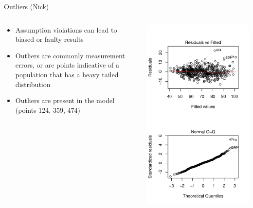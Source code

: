 \documentclass[table]{beamer}\usepackage[]{graphicx}\usepackage[]{color}
\makeatletter
\def\maxwidth{ %
  \ifdim\Gin@nat@width>\linewidth
    \linewidth
  \else
    \Gin@nat@width
  \fi
}
\newenvironment{knitrout}{}{} %
\makeatother
\begin{document}
\begin{frame}{Outliers (Nick)}
  \begin{columns}[t] %
  \begin{column}[c]{6cm}

\begin{itemize}
  \item Assumption violations can lead to biased or faulty results
  \item Outliers are commonly measurement errors, or are points indicative of a population that has a heavy tailed distribution
  \item Outliers are present in the model (points 124, 359, 474) 
\end{itemize}

  \end{column}
  \begin{column}[c]{4.5cm}
  
\begin{knitrout}
\color{fgcolor}
\includegraphics[width=\maxwidth]{figure/residual_plots} 


\end{knitrout}
\end{column}
\end{columns}
\end{frame}
\end{document}
